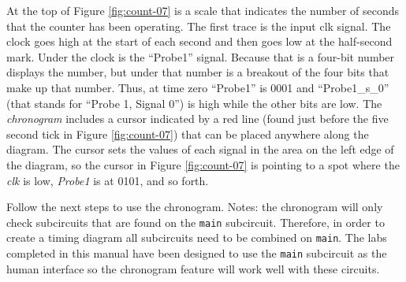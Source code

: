 At the top of Figure \ref{fig:count-07} is a scale that indicates the number of seconds that the counter has been operating. The first trace is the input clk signal. The clock goes high at the start of each second and then goes low at the half-second mark. Under the clock is the ``Probe1'' signal. Because that is a four-bit number \LE displays the number, but under that number is a breakout of the four bits that make up that number. Thus, at time zero ``Probe1'' is 0001 and ``Probe1\_s\_0'' (that stands for ``Probe 1, Signal 0'') is high while the other bits are low. The \LE \textit{chronogram} includes a cursor indicated by a red line (found just before the five second tick in Figure \ref{fig:count-07}) that can be placed anywhere along the diagram. The cursor sets the values of each signal in the area on the left edge of the diagram, so the cursor in Figure \ref{fig:count-07} is pointing to a spot where the \textit{clk} is low, \textit{Probe1} is at 0101, and so forth.

Follow the next steps to use the chronogram. Notes: the chronogram will only check subcircuits that are found on the  \lstinline[columns=fixed]|main| subcircuit. Therefore, in order to create a timing diagram all subcircuits need to be combined on \lstinline[columns=fixed]|main|. The labs completed in this manual have been designed to use the \lstinline[columns=fixed]|main| subcircuit as the human interface so the chronogram feature will work well with these circuits. 

